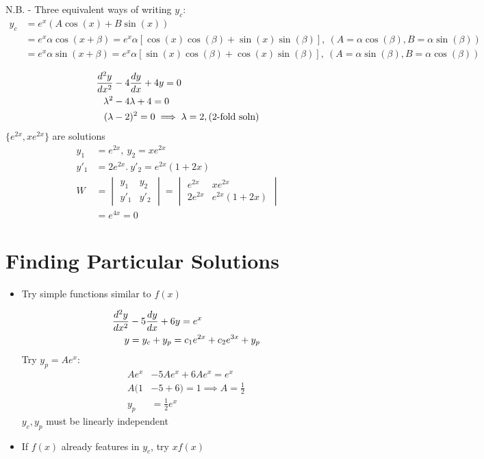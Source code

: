 \documentclass[Maths.tex]{subfiles}
\begin{document}
N.B. - Three equivalent ways of writing $y_c$:
\begin{align*}
    y_c &= e^x (A\cos(x) + B\sin(x)) \\
    &= e^x \alpha \cos(x + \beta) = e^x \alpha [\cos(x)\cos(\beta) + \sin(x)\sin(\beta)], ~(A = \alpha\cos(\beta), B = \alpha\sin(\beta)) \\
    &= e^x \alpha\sin(x + \beta) = e^x \alpha [\sin(x)\cos(\beta) + \cos(x)\sin(\beta)], ~(A = \alpha\sin(\beta), B = \alpha\cos(\beta))
\end{align*}

\begin{example}
\begin{align*}
 \frac{d^2 y}{dx^2} &- 4\frac{dy}{dx} + 4y = 0 \\
 \lambda^2 &- 4\lambda + 4 = 0  \\
 (\lambda &- 2)^2 = 0 \implies \lambda = 2, (\text{2-fold soln})
\end{align*}
$\{e^{2x},xe^{2x}\}$ are solutions
\begin{align*}
    y_1 &= e^{2x}, ~ y_2 = xe^{2x} \\
    y'_1 &= 2e^{2x}. ~ y'_2 = e^{2x}(1 + 2x) \\
    W &= \begin{vmatrix} y_1 & y_2 \\ y'_1 & y'_2 \end{vmatrix} = \begin{vmatrix} e^{2x} & xe^{2x} \\ 2e^{2x} & e^{2x}(1 + 2x) \end{vmatrix} \\
    &= e^{4x} = 0
\end{align*}
\end{example}

\section{Finding Particular Solutions}
\begin{itemize}
    \item Try simple functions similar to $f(x)$
    \begin{example}
    \begin{align*}
        \frac{d^2 y}{dx^2} &- 5\frac{dy}{dx} + 6y = e^x \\
        y &= y_c + y_p = c_1 e^{2x} + c_2e^{3x} + y_p
    \end{align*}
    Try $y_p = Ae^x$:
    \begin{align*}
        Ae^x &- 5Ae^x + 6Ae^x = e^x \\
        A(1 &- 5 + 6) = 1 \implies A = \frac{1}{2} \\
        y_p &= \frac{1}{2}e^x
    \end{align*}
    $y_c,y_p$ must be linearly independent
    \end{example}
    \item If $f(x)$ already features in $y_c$, try $xf(x)$
\end{itemize}
\end{document}
